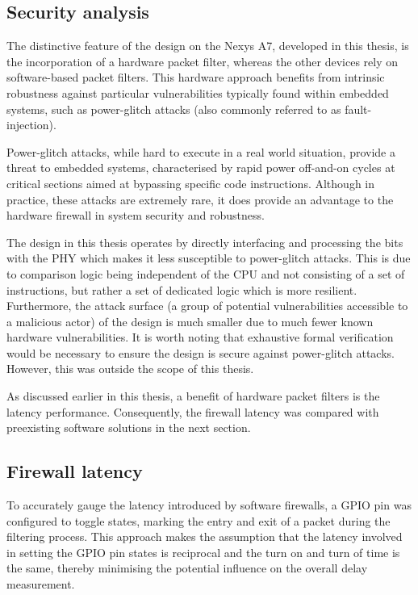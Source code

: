 \subsection{Security analysis}

The distinctive feature of the design on the Nexys A7, developed in this thesis, is the incorporation of a hardware packet filter, whereas the other devices rely on software-based packet filters. This hardware approach benefits from intrinsic robustness against particular vulnerabilities typically found within embedded systems, such as power-glitch attacks (also commonly referred to as fault-injection).

Power-glitch attacks, while hard to execute in a real world situation, provide a threat to embedded systems, characterised by rapid power off-and-on cycles at critical sections aimed at bypassing specific code instructions. Although in practice, these attacks are extremely rare, it does provide an advantage to the hardware firewall in system security and robustness.

The design in this thesis operates by directly interfacing and processing the bits with the PHY which makes it less susceptible to power-glitch attacks. This is due to comparison logic being independent of the CPU and not consisting of a set of instructions, but rather a set of dedicated logic which is more resilient. Furthermore, the attack surface (a group of potential vulnerabilities accessible to a malicious actor) of the design is much smaller due to much fewer known hardware vulnerabilities. It is worth noting that exhaustive formal verification would be necessary to ensure the design is secure against power-glitch attacks. However, this was outside the scope of this thesis.


As discussed earlier in this thesis, a benefit of hardware packet filters is the latency performance. Consequently, the firewall latency was compared with preexisting software solutions in the next section.


\subsection{Firewall latency}

To accurately gauge the latency introduced by software firewalls, a GPIO pin was configured to toggle states, marking the entry and exit of a packet during the filtering process. This approach makes the assumption that the latency involved in setting the GPIO pin states is reciprocal and the turn on and turn of time is the same, thereby minimising the potential influence on the overall delay measurement.

